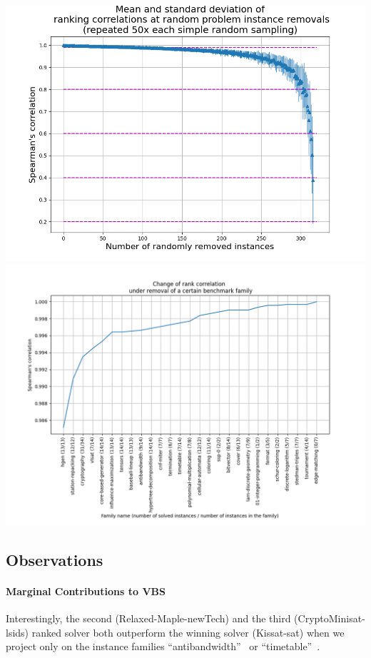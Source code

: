 \documentclass{elsarticle}
\begin{document}
\includegraphics[width=\textwidth]{stability/ALL_random_smpling_correlations.png}
\includegraphics[width=\textwidth]{stability/fam_leave_one_out_corr.png}



\subsection{Observations}

\paragraph{Marginal Contributions to VBS} Interestingly, the second (Relaxed-Maple-newTech) and the third (CryptoMinisat-lsids) ranked solver both outperform the winning solver (Kissat-sat) when we project only on the instance families ``antibandwidth''~\cite{} or ``timetable''~\cite{}. 
\end{document}
